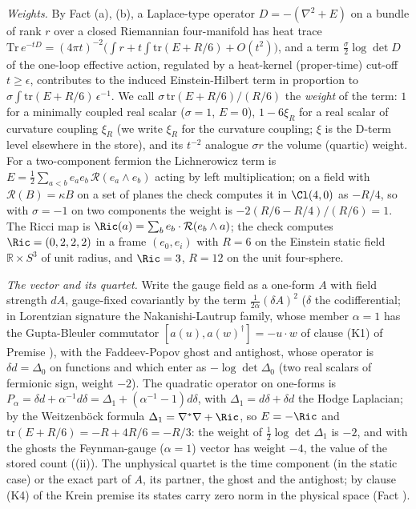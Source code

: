 \emph{Weights.} By Fact (a), (b), a Laplace-type operator $D = -(\nabla^{2} + E)$ on a bundle of rank $r$ over a closed Riemannian four-manifold has heat trace $\mathrm{Tr}\,e^{-tD} = (4\pi t)^{-2}\bigl(\int r + t\int\mathrm{tr}(E + R/6) + O(t^{2})\bigr)$, and a term $\tfrac{\sigma}{2}\log\det D$ of the one-loop effective action, regulated by a heat-kernel (proper-time) cut-off $t \ge \epsilon$, contributes to the induced Einstein-Hilbert term in proportion to $\sigma\int\mathrm{tr}(E + R/6)\,\epsilon^{-1}$. We call $\sigma\,\mathrm{tr}(E + R/6)/(R/6)$ the \emph{weight} of the term: $1$ for a minimally coupled real scalar ($\sigma = 1$, $E = 0$), $1 - 6\xi_{R}$ for a real scalar of curvature coupling $\xi_{R}$ (we write $\xi_{R}$ for the curvature coupling; $\xi$ is the D-term level elsewhere in the store), and its $t^{-2}$ analogue $\sigma r$ the volume (quartic) weight. For a two-component fermion the Lichnerowicz term is $E = \tfrac12\sum_{a<b}e_{a}e_{b}\,\mathcal{R}(e_{a}\wedge e_{b})$ acting by left multiplication; on a field with $\mathcal{R}(B) = \kappa B$ on a set of planes the check computes it in $\Cl(4,0)$ as $-R/4$, so with $\sigma = -1$ on two components the weight is $-2(R/6 - R/4)/(R/6) = 1$. The Ricci map is $\Ric(a) = \sum_{b}e_{b}\cdot\mathcal{R}(e_{b}\wedge a)$; the check computes $\Ric = (0, 2, 2, 2)$ in a frame $(e_{0}, e_{i})$ with $R = 6$ on the Einstein static field $\mathbb{R}\times S^{3}$ of unit radius, and $\Ric = 3$, $R = 12$ on the unit four-sphere.

\emph{The vector and its quartet.} Write the gauge field as a one-form $A$ with field strength $dA$, gauge-fixed covariantly by the term $\tfrac{1}{2\alpha}(\delta A)^{2}$ ($\delta$ the codifferential; in Lorentzian signature the Nakanishi-Lautrup family, whose member $\alpha = 1$ has the Gupta-Bleuler commutator $[a(u), a(w)^{\dagger}] = -u\cdot w$ of clause (K1) of Premise ), with the Faddeev-Popov ghost and antighost, whose operator is $\delta d = \Delta_{0}$ on functions and which enter as $-\log\det\Delta_{0}$ (two real scalars of fermionic sign, weight $-2$). The quadratic operator on one-forms is $P_{\alpha} = \delta d + \alpha^{-1}d\delta = \Delta_{1} + (\alpha^{-1} - 1)d\delta$, with $\Delta_{1} = d\delta + \delta d$ the Hodge Laplacian; by the Weitzenb\"ock formula $\Delta_{1} = \nabla^{*}\nabla + \Ric$, so $E = -\Ric$ and $\mathrm{tr}(E + R/6) = -R + 4R/6 = -R/3$: the weight of $\tfrac12\log\det\Delta_{1}$ is $-2$, and with the ghosts the Feynman-gauge ($\alpha = 1$) vector has weight $-4$, the value of the stored count ((ii)). The unphysical quartet is the time component (in the static case) or the exact part of $A$, its partner, the ghost and the antighost; by clause (K4) of the Krein premise its states carry zero norm in the physical space (Fact ).

